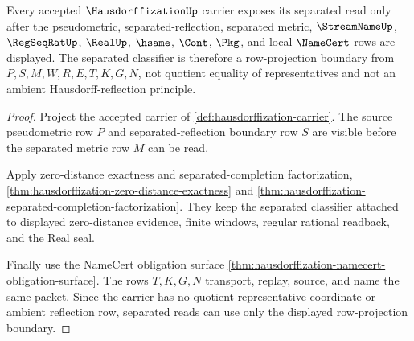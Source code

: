 \begin{theorem}
\label{thm:hausdorffization-separated-reflection-obligation}
Every accepted $\HausdorffizationUp$ carrier exposes its separated read only after the pseudometric, separated-reflection, separated metric, $\StreamNameUp$, $\RegSeqRatUp$, $\RealUp$, $\hsame$, $\Cont$, $\Pkg$, and local $\NameCert$ rows are displayed. The separated classifier is therefore a row-projection boundary from $P,S,M,W,R,E,T,K,G,N$, not quotient equality of representatives and not an ambient Hausdorff-reflection principle.
\end{theorem}
\begin{proof}
Project the accepted carrier of \autoref{def:hausdorffization-carrier}. The source pseudometric row $P$ and separated-reflection boundary row $S$ are visible before the separated metric row $M$ can be read.

Apply zero-distance exactness and separated-completion factorization, \autoref{thm:hausdorffization-zero-distance-exactness} and \autoref{thm:hausdorffization-separated-completion-factorization}. They keep the separated classifier attached to displayed zero-distance evidence, finite windows, regular rational readback, and the Real seal.

Finally use the NameCert obligation surface \autoref{thm:hausdorffization-namecert-obligation-surface}. The rows $T,K,G,N$ transport, replay, source, and name the same packet. Since the carrier has no quotient-representative coordinate or ambient reflection row, separated reads can use only the displayed row-projection boundary.
\end{proof}

